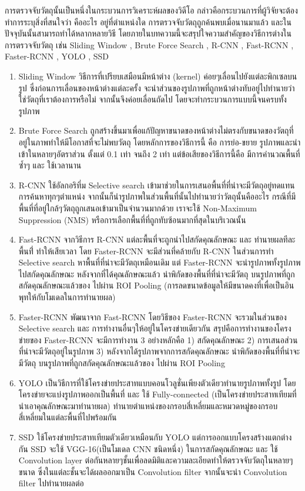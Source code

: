 การตรวจจับวัตถุนั้นเป็นหนึ่งในกระบวนการวิเคราะห์ผลของวิดีโอ กล่าวคือกระบวนการที่ผู้วิจัยจะต้องทำการระบุสิ่งที่สนใจว่า คืออะไร อยู่ที่ตำแหน่งใด 	การตรวจจับวัตถุถูกค้นพบเมื่อนานมาแล้ว และในปัจจุบันนั้นสามารถทำได้หลากหลายวิธี โดยภายในบทความนี้จะสรุปใจความสำคัญของวิธีการต่างในการตรวจจับวัตถุ เช่น Sliding Window , Brute Force Search , R-CNN , Fast-RCNN , Faster-RCNN , YOLO , SSD 
\begin{enumerate}
		\item Sliding Window วิธีการที่เปรียบเสมือนมีหน้าต่าง (kernel) ค่อยๆเลื่อนไปยังแต่ละพิกเซลบนรูป ซึ่งก่อนการเลื่อนของหน้าต่างแต่ละครั้ง จะนำส่วนของรูปภาพที่ถูกหน้าต่างทับอยู่ไปทำนายว่าใช่วัตถุที่เราต้องการหรือไม่ จากนั้นจึงค่อยเลื่อนถัดไป โดยจะทำกระบวนการแบบนี้จนครบทั้งรูปภาพ
	\item Brute Force Search ถูกสร้างขึ้นมาเพื่อแก้ปัญหาขนาดของหน้าต่างไม่ตรงกับขนาดของวัตถุที่อยู่ในภาพทำให้มีโอกาสที่จะไม่พบวัตถุ โดยหลักการของวิธีการนี้ คือ การย่อ-ขยาย รูปภาพและนำเข้าในหลายๆอัตราส่วน ตั้งแต่ 0.1 เท่า จนถึง 2 เท่า แต่ข้อเสียของวิธีการนี้คือ มีการคำนวณพื้นที่ซ้ำๆ และ ใช้เวลานาน
	\item R-CNN ใช้อัลกอริทึ่ม Selective search เข้ามาช่วยในการเสนอพื้นที่ที่น่าจะมีวัตถุอยู่ทดแทนการค้นหาทุกๆตำแหน่ง จากนั้นก็นำรูปภาพในส่วนพื้นที่นั้นไปทำนายว่าวัตถุนั้นคืออะไร กรณีที่มีพื้นที่ที่อยู่ใกล้ๆวัตถุถูกเสนอเข้ามาเป็นจำนวนมากด้วย เราจะใช้ Non-Maximum Suppression (NMS) หรือการเลือกพื้นที่ที่ถูกทับซ้อนมากที่สุดในบริเวณนั้น
	\item Fast-RCNN จากวิธีการ R-CNN แต่ละพื้นที่จะถูกนำไปสกัดคุณลักษณะ และ ทำนายผลทีละพื้นที่่ ทำให้เสียเวลา โดย Faster-RCNN จะมีส่วนที่คล้ายกับ R-CNN ในส่วนการทำ Selective search หาพื้นที่ที่น่าจะมีวัตถุเหมือนเดิม แต่ Faster-RCNN จะนำรูปภาพทั้งรูปภาพไปสกัดคุณลักษณะ หลังจากที่ได้คุณลักษณะแล้ว นำพิกัดของพื้นที่ที่น่าจะมีวัตถุ บนรูปภาพที่ถูกสกัดคุณลักษณะแล้วของ ไปผ่าน ROI Pooling (การลดขนาดข้อมูลให้มีขนาดคงที่เพื่อเป็นอินพุทให้กับโมเดลในการทำนายผล)
	\item Faster-RCNN พัฒนาจาก Fast-RCNN โดยวิธีของ Faster-RCNN จะรวมในส่วนของ Selective search และ การทำงานอื่นๆให้อยู่ในโครงข่ายเดียวกัน สรุปคือการทำงานของโครงข่ายของ Faster-RCNN จะมีการทำงาน 3 อย่างหลักคือ 1) สกัดคุณลักษณะ 2) การเสนอส่วนที่น่าจะมีวัตถุอยู่ในรูปภาพ 3) หลังจากได้รูปภาพจากการสกัดคุณลักษณะ นำพิกัดของพื้นที่ที่น่าจะมีวัตถุ บนรูปภาพที่ถูกสกัดคุณลักษณะแล้วของ ไปผ่าน ROI Pooling
	\item YOLO เป็นวิธีการที่ใช้โครงข่ายประสาทแบบคอนโวลูชั่นเพียงตัวเดียวทำนายรูปภาพทั้งรูป โดยโครงข่ายจะแบ่งรูปภาพออกเป็นพื้นที่ และ ใช้ Fully-connected (เป็นโครงข่ายประสาทเทียมที่นำเอาคุณลักษณะมาทำนายผล) ทำนายตำแหน่งของกรอบสี่เหลี่ยมและหมวดหมู่ของกรอบสี่เหลี่ยมในแต่ละพื้นที่ไปพร้อมกัน 
	\item SSD ใช้โครงข่ายประสาทเทียมตัวเดียวเหมือนกับ YOLO แต่การออกแบบโครงสร้างแตกต่างกัน SSD จะใช้ VGG-16(เป็นโมเดล CNN ชนิดหนึ่ง) ในการสกัดคุณลักษณะ และ ใช้ Convolution layer ต่อกันหลายๆชั้นเพื่อลดมิติและความละเอียดทำให้ตรวจจับวัตถุในหลายๆขนาด ซึ่งในแต่ละชั้นจะได้ผลออกมาเป็น Convolution filter จากนั้นจะนำ Convolution filter ไปทำนายผลต่อ
\end{enumerate}

